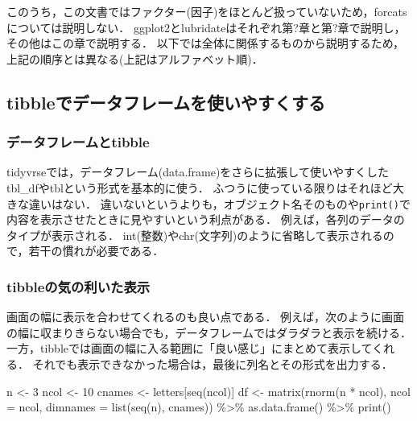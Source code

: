 \documentclass[
]{article}
\newenvironment{Shaded}{\begin{snugshade}}{\end{snugshade}}
\newcommand{\AttributeTok}[1]{\textcolor[rgb]{0.77,0.63,0.00}{#1}}
\newcommand{\DecValTok}[1]{\textcolor[rgb]{0.00,0.00,0.81}{#1}}
\newcommand{\FunctionTok}[1]{\textcolor[rgb]{0.00,0.00,0.00}{#1}}
\newcommand{\NormalTok}[1]{#1}
\newcommand{\OtherTok}[1]{\textcolor[rgb]{0.56,0.35,0.01}{#1}}
\newcommand{\SpecialCharTok}[1]{\textcolor[rgb]{0.00,0.00,0.00}{#1}}
\begin{document}
このうち，この文書ではファクター(因子)をほとんど扱っていないため，forcatsについては説明しない．
ggplot2とlubridateはそれぞれ第?章と第?章で説明し，その他はこの章で説明する．
以下では全体に関係するものから説明するため，上記の順序とは異なる(上記はアルファベット順)．

\hypertarget{tibbleux3067ux30c7ux30fcux30bfux30d5ux30ecux30fcux30e0ux3092ux4f7fux3044ux3084ux3059ux304fux3059ux308b}{%
\subsection{tibbleでデータフレームを使いやすくする}\label{tibbleux3067ux30c7ux30fcux30bfux30d5ux30ecux30fcux30e0ux3092ux4f7fux3044ux3084ux3059ux304fux3059ux308b}}

\hypertarget{ux30c7ux30fcux30bfux30d5ux30ecux30fcux30e0ux3068tibble}{%
\subsubsection{データフレームとtibble}\label{ux30c7ux30fcux30bfux30d5ux30ecux30fcux30e0ux3068tibble}}

tidyvrseでは，データフレーム(data.frame)をさらに拡張して使いやすくした tbl\_dfやtblという形式を基本的に使う．
ふつうに使っている限りはそれほど大きな違いはない．
違いないというよりも，オブジェクト名そのものや\texttt{print()}で内容を表示させたときに見やすいという利点がある．
例えば，各列のデータのタイプが表示される．
int(整数)やchr(文字列)のように省略して表示されるので，若干の慣れが必要である．

\hypertarget{tibbleux306eux6c17ux306eux5229ux3044ux305fux8868ux793a}{%
\subsubsection{tibbleの気の利いた表示}\label{tibbleux306eux6c17ux306eux5229ux3044ux305fux8868ux793a}}

画面の幅に表示を合わせてくれるのも良い点である．
例えば，次のように画面の幅に収まりきらない場合でも，データフレームではダラダラと表示を続ける．
一方，tibbleでは画面の幅に入る範囲に「良い感じ」にまとめて表示してくれる．
それでも表示できなかった場合は，最後に列名とその形式を出力する．

\begin{Shaded}
\begin{Highlighting}[]
\NormalTok{n }\OtherTok{\textless{}{-}} \DecValTok{3}
\NormalTok{ncol }\OtherTok{\textless{}{-}} \DecValTok{10}
\NormalTok{cnames }\OtherTok{\textless{}{-}}\NormalTok{ letters[}\FunctionTok{seq}\NormalTok{(ncol)]}
\NormalTok{df }\OtherTok{\textless{}{-}} 
  \FunctionTok{matrix}\NormalTok{(}\FunctionTok{rnorm}\NormalTok{(n }\SpecialCharTok{*}\NormalTok{ ncol), }\AttributeTok{ncol =}\NormalTok{ ncol, }\AttributeTok{dimnames =} \FunctionTok{list}\NormalTok{(}\FunctionTok{seq}\NormalTok{(n), cnames)) }\SpecialCharTok{\%\textgreater{}\%}
  \FunctionTok{as.data.frame}\NormalTok{() }\SpecialCharTok{\%\textgreater{}\%}
  \FunctionTok{print}\NormalTok{()}
\end{Highlighting}
\end{Shaded}
\end{document}
